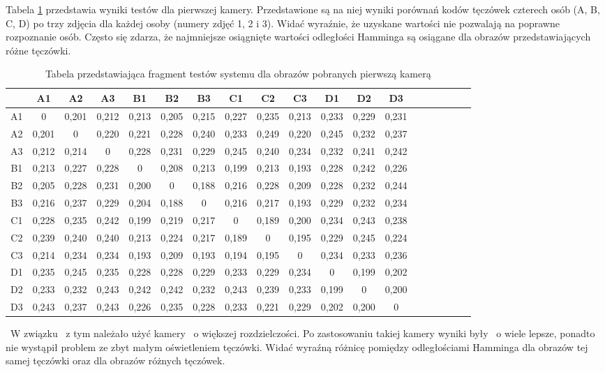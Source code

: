Tabela \ref{tab:pierwsza} przedstawia wyniki testów dla pierwszej kamery. Przedstawione są na niej wyniki porównań kodów tęczówek czterech osób (A, B, C, D) po trzy zdjęcia dla każdej osoby (numery zdjęć 1, 2 i 3). Widać wyraźnie, że uzyskane wartości nie pozwalają na poprawne rozpoznanie osób. Często się zdarza, że najmniejsze osiągnięte wartości odległości Hamminga są osiągane dla obrazów przedstawiających różne tęczówki.

\begin{table}
\begin{center}
\caption{Tabela przedstawiająca fragment testów systemu dla obrazów pobranych pierwszą kamerą}
\label{tab:pierwsza}
\begin{tabular}{|c|c|c|c|c|c|c|c|c|c|c|c|c|c|c|c|c|c|c|}
\hline
 & A1 & A2 & A3 & B1 & B2 & B3 & C1 & C2 & C3 & D1 & D2 & D3\\ \hline
A1 & 0&0,201&0,212&0,213&0,205&0,215&0,227&0,235&0,213&0,233&0,229&0,231 \\ \hline
A2 & 0,201&0&0,220&0,221&0,228&0,240&0,233&0,249&0,220&0,245&0,232&0,237 \\ \hline
A3 & 0,212&0,214&0&0,228&0,231&0,229&0,245&0,240&0,234&0,232&0,241&0,242\\ \hline
B1 & 0,213&0,227&0,228&0&0,208&0,213&0,199&0,213&0,193&0,228&0,242&0,226\\ \hline
B2 & 0,205&0,228&0,231&0,200&0&0,188&0,216&0,228&0,209&0,228&0,232&0,244\\ \hline
B3 & 0,216&0,237&0,229&0,204&0,188&0&0,216&0,217&0,193&0,229&0,232&0,234\\ \hline
C1 & 0,228&0,235&0,242&0,199&0,219&0,217&0&0,189&0,200&0,234&0,243&0,238\\ \hline
C2 & 0,239&0,240&0,240&0,213&0,224&0,217&0,189&0&0,195&0,229&0,245&0,224\\ \hline
C3 & 0,214&0,234&0,234&0,193&0,209&0,193&0,194&0,195&0&0,234&0,233&0,236\\ \hline
D1 & 0,235&0,245&0,235&0,228&0,228&0,229&0,233&0,229&0,234&0&0,199&0,202\\ \hline
D2 & 0,233&0,232&0,243&0,242&0,242&0,232&0,243&0,239&0,233&0,199&0&0,200\\ \hline
D3 & 0,243&0,237&0,243&0,226&0,235&0,228&0,233&0,221&0,229&0,202&0,200&0\\ \hline
\end{tabular}
\end{center}
\end{table}

~W związku ~z tym należało użyć kamery ~o większej rozdzielczości. Po zastosowaniu takiej kamery wyniki były ~o wiele lepsze, ponadto nie wystąpił problem ze zbyt małym oświetleniem tęczówki. Widać wyraźną różnicę pomiędzy odległościami Hamminga dla obrazów tej samej tęczówki oraz dla obrazów różnych tęczówek.

